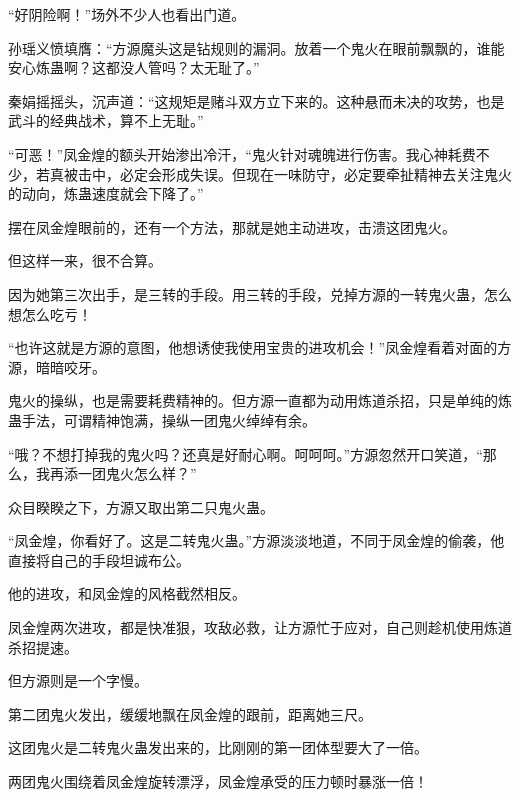 \begin{this_body}
“好阴险啊！”场外不少人也看出门道。

孙瑶义愤填膺：“方源魔头这是钻规则的漏洞。放着一个鬼火在眼前飘飘的，谁能安心炼蛊啊？这都没人管吗？太无耻了。”

秦娟摇摇头，沉声道：“这规矩是赌斗双方立下来的。这种悬而未决的攻势，也是武斗的经典战术，算不上无耻。”

“可恶！”凤金煌的额头开始渗出冷汗，“鬼火针对魂魄进行伤害。我心神耗费不少，若真被击中，必定会形成失误。但现在一味防守，必定要牵扯精神去关注鬼火的动向，炼蛊速度就会下降了。”

摆在凤金煌眼前的，还有一个方法，那就是她主动进攻，击溃这团鬼火。

但这样一来，很不合算。

因为她第三次出手，是三转的手段。用三转的手段，兑掉方源的一转鬼火蛊，怎么想怎么吃亏！

“也许这就是方源的意图，他想诱使我使用宝贵的进攻机会！”凤金煌看着对面的方源，暗暗咬牙。

鬼火的操纵，也是需要耗费精神的。但方源一直都为动用炼道杀招，只是单纯的炼蛊手法，可谓精神饱满，操纵一团鬼火绰绰有余。

“哦？不想打掉我的鬼火吗？还真是好耐心啊。呵呵呵。”方源忽然开口笑道，“那么，我再添一团鬼火怎么样？”

众目睽睽之下，方源又取出第二只鬼火蛊。

“凤金煌，你看好了。这是二转鬼火蛊。”方源淡淡地道，不同于凤金煌的偷袭，他直接将自己的手段坦诚布公。

他的进攻，和凤金煌的风格截然相反。

凤金煌两次进攻，都是快准狠，攻敌必救，让方源忙于应对，自己则趁机使用炼道杀招提速。

但方源则是一个字慢。

第二团鬼火发出，缓缓地飘在凤金煌的跟前，距离她三尺。

这团鬼火是二转鬼火蛊发出来的，比刚刚的第一团体型要大了一倍。

两团鬼火围绕着凤金煌旋转漂浮，凤金煌承受的压力顿时暴涨一倍！

\end{this_body}

